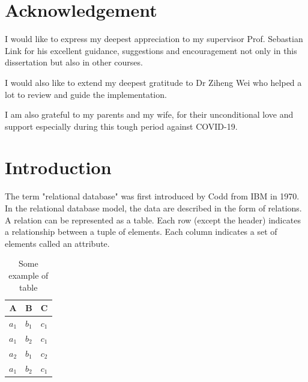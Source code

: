 \documentclass[11pt]{book}
\begin{document}
\chapter*{Acknowledgement}       
\setcounter{page}{2}
\pagestyle{headings}


I would like to express my deepest appreciation to my supervisor Prof. Sebastian Link for his excellent guidance, suggestions and encouragement not only in this dissertation but also in other courses.

I would also like to extend my deepest gratitude to Dr Ziheng Wei who helped a lot to review and guide the implementation.

I am also grateful to my parents and my wife, for their unconditional love and support especially during this tough period against COVID-19.



\setcounter{secnumdepth}{3}
\setcounter{tocdepth}{3}
\tableofcontents

	
\chapter{Introduction}

The term "relational database" was first introduced by Codd \cite{codd13f} from IBM in 1970. In the relational database model, the data are described in the form of relations. A relation can be represented as a table. Each row (except the header) indicates a relationship between a tuple of elements. Each column indicates a set of elements called an attribute.

\begin{table}[H]
	\centering
	
	\begin{tabular}{ c c c }
		A     & B     & C \\
		\hline
		$a_1$ & $b_1$ & $c_1$ \\ 
		$a_1$ & $b_2$ & $c_1$ \\ 
		$a_2$ & $b_1$ & $c_2$ \\
		$a_1$ & $b_2$ & $c_1$ \\
	\end{tabular}
	
	\caption{Some example of table}
	
	\label{example_table_1}
\end{table}
\end{document}
